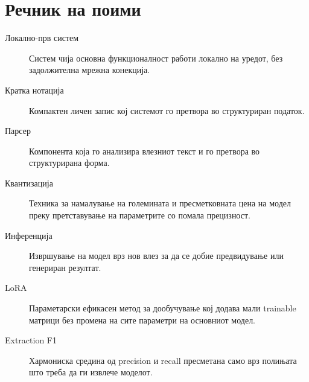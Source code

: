 \chapter{Речник на поими}

\begin{description}
  \item[Локално-прв систем] Систем чија основна функционалност работи локално на уредот, без задолжителна мрежна конекција.
  \item[Кратка нотација] Компактен личен запис кој системот го претвора во структуриран податок.
  \item[Парсер] Компонента која го анализира влезниот текст и го претвора во структурирана форма.
  \item[Квантизација] Техника за намалување на големината и пресметковната цена на модел преку претставување на параметрите со помала прецизност.
  \item[Инференција] Извршување на модел врз нов влез за да се добие предвидување или генериран резултат.
  \item[LoRA] Параметарски ефикасен метод за дообучување кој додава мали trainable матрици без промена на сите параметри на основниот модел.
  \item[Extraction F1] Хармониска средина од precision и recall пресметана само врз полињата што треба да ги извлече моделот.
\end{description}
